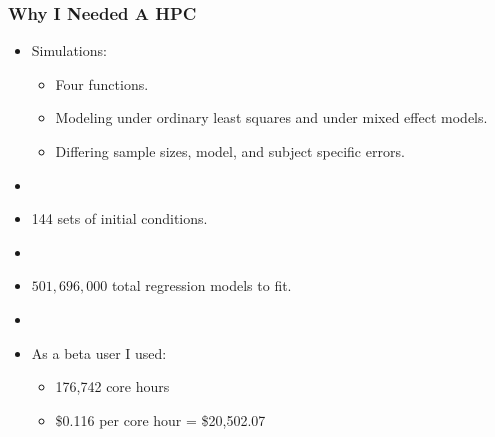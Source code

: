 \documentclass[10pt]{beamer}
\begin{document}
\begin{frame}
  \frametitle{Why I Needed A HPC}
  \begin{itemize}
    \item Simulations:
      \begin{itemize}
        \item Four functions.
        \item Modeling under ordinary least squares and under mixed effect models.
        \item Differing sample sizes, model, and subject specific errors.
      \end{itemize}
    \item[]
    \item 144 sets of initial conditions.
    \item[]
    \item $501,696,000$ total regression models to fit.

    \item[]

    \item As a beta user I used:
      \begin{itemize}
        \item 176,742 core hours
        \item \$0.116 per core hour = \$20,502.07
      \end{itemize}
  \end{itemize}
\end{frame}
\end{document}
